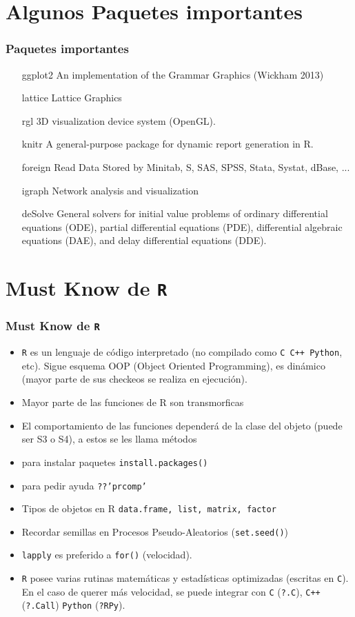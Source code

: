 \documentclass[10pt, letterpaper]{beamer}\usepackage{graphicx, color}
\begin{document}
\section{Algunos Paquetes importantes}

\begin{frame}[fragile]
\frametitle{Paquetes importantes}
\begin{itemize}
\item[ggplot2] An implementation of the Grammar Graphics (Wickham 2013)
\item[lattice] Lattice Graphics
\item[rgl] 3D visualization device system (OpenGL).
\item[knitr] A general-purpose package for dynamic report generation in R.
\item[foreign] Read Data Stored by Minitab, S, SAS, SPSS, Stata, Systat, dBase, ...
\item[igraph] Network analysis and visualization
\item[deSolve] General solvers for initial value problems of ordinary  differential equations (ODE), partial differential  equations (PDE), differential algebraic equations (DAE), and delay differential  equations (DDE).
\end{itemize}
\end{frame}

\section{Must Know de {\tt R}}

\begin{frame}[fragile]
\frametitle{Must Know de {\tt R}}
\begin{itemize}
\item {\tt R} es un lenguaje de c\'odigo interpretado (no compilado como {\tt C C++ Python}, etc). Sigue esquema OOP (Object Oriented Programming), es din\'amico (mayor parte de sus checkeos se realiza en ejecuci\'on).
\item Mayor parte de las funciones de R son transmorficas
\item El comportamiento de las funciones depender\'a de la clase del objeto (puede ser S3 o S4), a estos se les llama m\'etodos
\item para instalar paquetes {\tt install.packages()}
\item para pedir ayuda {\tt ??'prcomp'}
\item Tipos de objetos en R {\tt data.frame, list, matrix, factor}
\item Recordar semillas en Procesos Pseudo-Aleatorios ({\tt set.seed()})
\item {\tt lapply} es preferido a {\tt for()} (velocidad).
\item {\tt R} posee varias rutinas matem\'aticas y estad\'isticas optimizadas (escritas en {\tt C}). En el caso de querer m\'as velocidad, se puede integrar con {\tt C} ({\tt ?.C}), {\tt C++} ({\tt ?.Call}) {\tt Python} ({\tt ?RPy}).
\end{itemize}
\end{frame}
\end{document}
